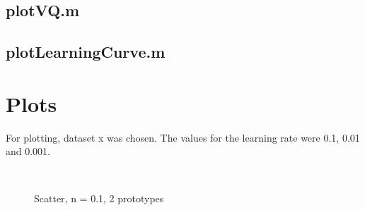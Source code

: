 \documentclass[10pt,a4paper]{article}
\begin{document}
\subsection{plotVQ.m}


\subsection{plotLearningCurve.m}


\section{Plots}
For plotting, dataset x was chosen. The values for the learning rate were 0.1, 0.01 and 0.001.

\begin{figure}
  \centering
     \\
  \caption{Scatter, n = 0.1, 2 prototypes}
  \label{fig:n01_k2}
\end{figure}
\end{document}
